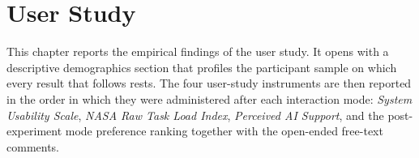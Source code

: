 \chapter{User Study}
\label{ch:userstudy}

This chapter reports the empirical findings of the user study. It
opens with a descriptive demographics section that profiles the
participant sample on which every result that follows rests. The
four user-study instruments are then reported in the order in
which they were administered after each interaction mode: \textit{System
Usability Scale}, \textit{NASA Raw Task Load Index}, \textit{Perceived AI Support},
and the post-experiment mode preference ranking together with the
open-ended free-text comments.







